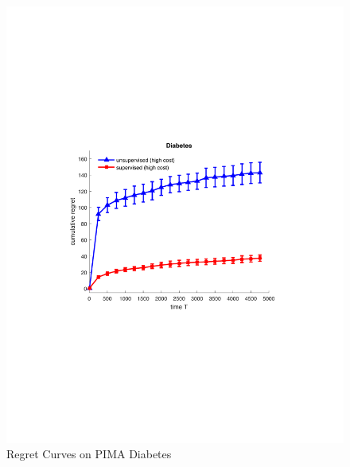 \begin{center}
	\begin{figure}
		\begin{minipage}{8cm}
			\centering
			\includegraphics[scale=0.4]{../Simulations/Figures/Diabetes_WD1}
			\vspace{-.3cm}
			\caption{\footnotesize Regret Curves on PIMA Diabetes}
			\label{fig:Diabetes}
		\end{minipage}
		\begin{minipage}{8cm}
			\centering

\end{minipage}
\end{figure}
\end{center}
